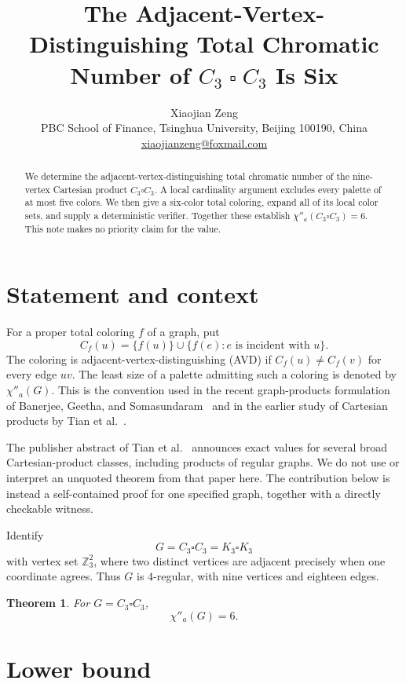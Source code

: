 \documentclass[11pt]{article}
\title{The Adjacent-Vertex-Distinguishing Total Chromatic Number of
$C_3\mathbin{\square}C_3$ Is Six}
\author{Xiaojian Zeng\\
PBC School of Finance, Tsinghua University, Beijing 100190, China\\
\href{mailto:xiaojianzeng@foxmail.com}{xiaojianzeng@foxmail.com}}
\date{}
\newtheorem{theorem}{Theorem}
\newcommand{\Z}{\mathbb Z}
\begin{document}
\maketitle

\begin{abstract}
We determine the adjacent-vertex-distinguishing total chromatic number of the
nine-vertex Cartesian product $C_3\square C_3$.  A local cardinality argument
excludes every palette of at most five colors.  We then give a six-color total
coloring, expand all of its local color sets, and supply a deterministic
verifier.  Together these establish
$\chi''_a(C_3\square C_3)=6$.  This note makes no priority claim for the value.
\end{abstract}

\section{Statement and context}

For a proper total coloring $f$ of a graph, put
\[
 C_f(u)=\{f(u)\}\cup\{f(e):e\text{ is incident with }u\}.
\]
The coloring is adjacent-vertex-distinguishing (AVD) if
$C_f(u)\ne C_f(v)$ for every edge $uv$.  The least size of a palette
admitting such a coloring is denoted by $\chi''_a(G)$.  This is the convention
used in the recent graph-products formulation of Banerjee, Geetha, and
Somasundaram~\cite{BanerjeeGeethaSomasundaram2026} and in the earlier study of
Cartesian products by Tian et al.~\cite{TianChenShaoWang2014}.

The publisher abstract of Tian et al.~\cite{TianChenShaoWang2014} announces
exact values for several broad Cartesian-product classes, including products
of regular graphs.  We do not use or interpret an unquoted theorem from that
paper here.  The contribution below is instead a self-contained proof for one
specified graph, together with a directly checkable witness.

Identify
\[
G=C_3\square C_3=K_3\square K_3
\]
with vertex set $\Z_3^2$, where two distinct vertices are adjacent precisely
when one coordinate agrees.  Thus $G$ is $4$-regular, with nine vertices and
eighteen edges.

\begin{theorem}
For $G=C_3\square C_3$,
\[
\chi''_a(G)=6.
\]
\end{theorem}

\section{Lower bound}
\end{document}
